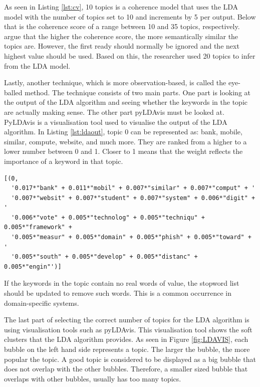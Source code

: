 As seen in Listing \ref{lst:cv}, 10 topics is a coherence model that uses the LDA model with the number of topics set to 10 and increments by 5 per output. Below that is the coherence score of a range between 10 and 35 topics, respectively.  argue that the higher the coherence score, the more semantically similar the topics are. However, the first ready should normally be ignored and the next highest value should be used. Based on this, the researcher used 20 topics to infer from the LDA model.

Lastly, another technique, which is more observation-based, is called the eye-balled method. The technique consists of two main parts. One part is looking at the output of the LDA algorithm and seeing whether the keywords in the topic are actually making sense. The other part pyLDAvis must be looked at. PyLDAvis is a visualisation tool used to visualise the output of the LDA algorithm. In Listing \ref{lst:ldaout}, topic 0 can be represented as: bank, mobile, similar, compute, website, and much more. They are ranked from a higher to a lower number between 0 and 1. Closer to 1 means that the weight reflects the importance of a keyword in that topic.

\begin{lstlisting}[language=text, label={lst:ldaout}, caption=LDA topic output]
[(0,
  '0.017*"bank" + 0.011*"mobil" + 0.007*"similar" + 0.007*"comput" + '
  '0.007*"websit" + 0.007*"student" + 0.007*"system" + 0.006*"digit" + '
  '0.006*"vote" + 0.005*"technolog" + 0.005*"techniqu" + 0.005*"framework" +
  '0.005*"measur" + 0.005*"domain" + 0.005*"phish" + 0.005*"toward" + '
  '0.005*"south" + 0.005*"develop" + 0.005*"distanc" + 0.005*"engin"')]
\end{lstlisting}

If the keywords in the topic contain no real words of value, the stopword list should be updated to remove such words. This is a common occurrence in domain-specific systems. 

The last part of selecting the correct number of topics for the LDA algorithm is using visualisation tools such as pyLDAvis. This visualisation tool shows the soft clusters that the LDA algorithm provides. As seen in Figure \ref{fig:LDAVIS}, each bubble on the left hand side represents a topic. The larger the bubble, the more popular the topic. A good topic is considered to be displayed as a big bubble that does not overlap with the other bubbles. Therefore, a smaller sized bubble that overlaps with other bubbles, usually has too many topics. 


